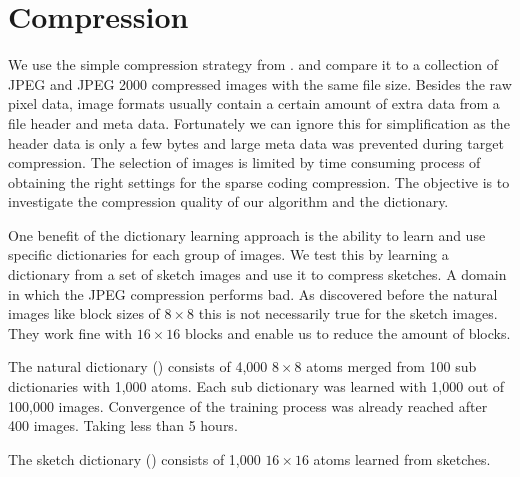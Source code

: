 
\clearpage
\section{Compression}
We use the simple compression strategy from .
and compare it to a collection of JPEG and JPEG 2000 compressed images with the
same file size. Besides the raw pixel data, image formats usually contain a
certain amount of extra data from a file header and meta data. Fortunately we
can ignore this for simplification as the header data is only a few bytes and
large meta data was prevented during target compression. The selection of
images is limited by time consuming process of obtaining the right settings
for the sparse coding compression.
The objective is to investigate the compression quality of our algorithm and
the dictionary. 

One benefit of the dictionary learning approach is the ability to learn and
use specific dictionaries for each group of images. We test this by learning a
dictionary from a set of sketch images and use it to compress sketches. A domain
in which the JPEG compression performs bad. As discovered before the natural
images like block sizes of $8\times 8$ this is not necessarily true for the
sketch images. They work fine with $16\times 16$ blocks and enable us to reduce
the amount of blocks.

The natural dictionary () consists of 4,000 $8 \times
8$ atoms merged from 100 sub dictionaries with 1,000 atoms. Each sub
dictionary was learned with 1,000 out of 100,000 images. Convergence of the
training process was already reached after 400 images. Taking less than 5
hours.

The sketch dictionary () consists of 1,000
$16\times 16$ atoms learned from  sketches.

